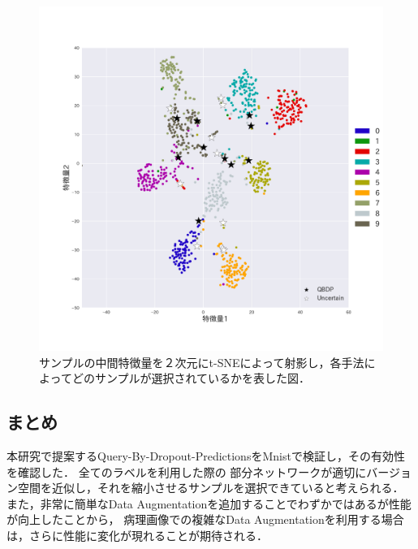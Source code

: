 \begin{figure}[h]
    \begin{center}
     \includegraphics[width=12cm]{figures/mnist_scatter.pdf}
    \end{center}
   \caption{\label{fig:mnist_scatter}サンプルの中間特徴量を２次元にt-SNEによって射影し，各手法によってどのサンプルが選択されているかを表した図．}
\end{figure}

\clearpage

\subsection{まとめ}
本研究で提案するQuery-By-Dropout-PredictionsをMnistで検証し，その有効性を確認した．
全てのラベルを利用した際の
部分ネットワークが適切にバージョン空間を近似し，それを縮小させるサンプルを選択できていると考えられる．
また，非常に簡単なData Augmentationを追加することでわずかではあるが性能が向上したことから，
病理画像での複雑なData Augmentationを利用する場合は，さらに性能に変化が現れることが期待される．
